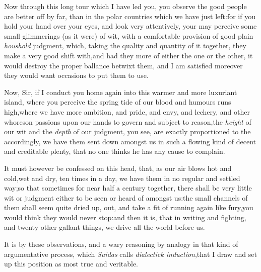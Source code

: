 \documentclass{article}
\begin{document}
Now through this long tour which\break
I have led you, you observe the
good people are better off by far, than in the polar countries
which we have just left:\break\tsk for if you hold your hand over your
eyes, and look very attentively, your may perceive some small
glimmerings (as it were) of wit, with a comfortable provision of
good plain \textit{houshold} judgment, which, taking the quality and
quantity of it together, they make a very good shift
with,\tsk and had they more of either the one or the other,
it would destroy the proper ballance betwixt them, and I am
satisfied moreover they would want occasions to put them to
use.

Now, Sir, if I conduct you home again into this warmer and more
luxuriant island, where you perceive the spring tide of our blood
and humours runs high,\tsh where we have more ambition, and
pride, and envy, and lechery, and other whoreson passions upon our
hands to govern and subject to reason,\tsk the
\textit{height} of our wit and the \textit{depth} of our judgment, you
see, are exactly proportioned to the 
accordingly, we
have them sent down amongst us in such a flowing kind of decent and
creditable plenty, that no one thinks he has any cause to
complain.

It must however be confessed on this head, that, as our air
blows hot and cold,\break\tsh wet and dry, ten times in a day, we have
them in no regular and settled way;\break\tsh so that sometimes for
near half a century together, there shall be very little wit or
judgment either to be seen or heard of amongst us:\tsk the
small channels of them shall seem quite dried up,\tsk\break 
{}
out, and take a fit of running again like fury,\tsh you would think they would
never stop:\tsh and then it is, that in writing and fighting, and twenty other
gallant things, we drive all the world before us.

It is by these observations, and a wary reasoning by analogy in
that kind of argumentative process, which \textit{Suidas} calls
\textit{dialectick induction},\tsk that I draw and set up
this position as most true and veri\-table.
\end{document}
